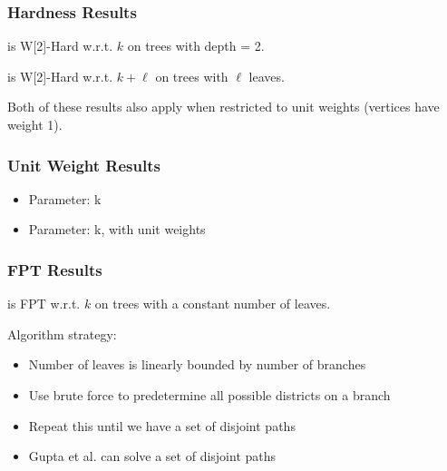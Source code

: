 \begin{frame}
    \frametitle{Hardness Results}
    \begin{theorem}
        \gm is W[2]-Hard w.r.t. $k$ on trees with depth = 2.
    \end{theorem}
    
    \vspace{1.0cm}
     {
    \begin{theorem}
        \gm is W[2]-Hard w.r.t. $k+\ell$ on trees with $\ell$ leaves.
    \end{theorem}
    }
    
    \vspace{1.0cm}
     {
        Both of these results also apply when restricted to unit weights (vertices have weight 1).
    }
    
\end{frame}

\begin{frame}
    \frametitle{Unit Weight Results}
    \begin{itemize}
        \item Parameter: k
    \end{itemize}
	

    \begin{itemize}
        \item Parameter: k, with unit weights
    \end{itemize}
    
\end{frame}

\begin{frame}
    \frametitle{FPT Results}
    \begin{theorem}
        \gm is FPT w.r.t. $k$ on trees with a constant number of leaves.
    \end{theorem}
    
    \vspace{1.0cm}
     {
        Algorithm strategy:
        \begin{itemize}
            \item Number of leaves is linearly bounded by number of branches
            \item Use brute force to predetermine all possible districts on a branch
            \item Repeat this until we have a set of disjoint paths
            \item Gupta et al. can solve a set of disjoint paths
        \end{itemize}
    }
\end{frame}


